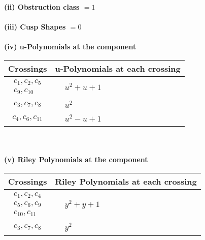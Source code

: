 \documentclass[1p]{elsarticle_modified}
\theoremstyle{definition}
\begin{document}
\flushleft \textbf{(ii) Obstruction class $= 1$}\\~\\
\flushleft \textbf{(iii) Cusp Shapes $= 0$}\\~\\
\newpage\renewcommand{\arraystretch}{1}
\flushleft \textbf{(iv) u-Polynomials at the component}\newline \\
\begin{tabular}{m{50pt}|m{274pt}}
Crossings & \hspace{64pt}u-Polynomials at each crossing \\
\hline $$\begin{aligned}c_{1},c_{2},c_{5}\\c_{9},c_{10}\end{aligned}$$&$\begin{aligned}
&u^2+u+1
\end{aligned}$\\
\hline $$\begin{aligned}c_{3},c_{7},c_{8}\end{aligned}$$&$\begin{aligned}
&u^2
\end{aligned}$\\
\hline $$\begin{aligned}c_{4},c_{6},c_{11}\end{aligned}$$&$\begin{aligned}
&u^2- u+1
\end{aligned}$\\
\hline
\end{tabular}\\~\\
\newpage\renewcommand{\arraystretch}{1}
\flushleft \textbf{(v) Riley Polynomials at the component}\newline \\
\begin{tabular}{m{50pt}|m{274pt}}
Crossings & \hspace{64pt}Riley Polynomials at each crossing \\
\hline $$\begin{aligned}c_{1},c_{2},c_{4}\\c_{5},c_{6},c_{9}\\c_{10},c_{11}\end{aligned}$$&$\begin{aligned}
&y^2+y+1
\end{aligned}$\\
\hline $$\begin{aligned}c_{3},c_{7},c_{8}\end{aligned}$$&$\begin{aligned}
&y^2
\end{aligned}$\\
\hline
\end{tabular}\\~\\
\end{document}

